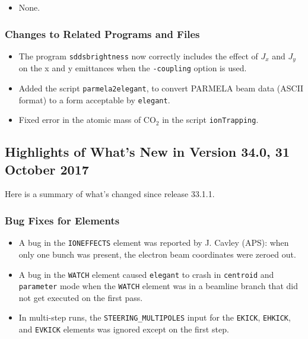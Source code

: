 \documentclass[11pt]{article}
\begin{document}
\begin{itemize}
\item None.
\end{itemize}

\subsubsection{Changes to Related Programs and Files}

\begin{itemize}
\item The program \verb|sddsbrightness| now correctly includes the effect of $J_x$ and $J_y$ on the x and y emittances
  when the \verb|-coupling| option is used.
\item Added the script \verb|parmela2elegant|, to convert PARMELA beam data (ASCII format) to a form
  acceptable by \verb|elegant|.
\item Fixed error in the atomic mass of CO$_2$ in the script \verb|ionTrapping|.
\end{itemize}

\subsection{Highlights of What's New in Version 34.0, 31 October 2017}

Here is a summary of what's changed since release 33.1.1.

\subsubsection{Bug Fixes for Elements}

\begin{itemize}
\item A bug in the \verb|IONEFFECTS| element was reported by J. Cavley (APS): when only one bunch was present,
  the electron beam coordinates were zeroed out.  
\item A bug in the \verb|WATCH| element caused \verb|elegant| to crash in \verb|centroid| and \verb|parameter|
  mode when the \verb|WATCH| element was in a beamline branch that did not get executed on the first pass.
\item In multi-step runs, the \verb|STEERING_MULTIPOLES| input for the \verb|EKICK|, \verb|EHKICK|, and \verb|EVKICK| elements
  was ignored except on the first step.
\end{itemize}
\end{document}
